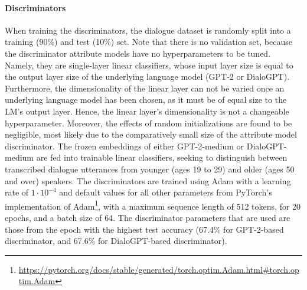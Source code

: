 \paragraph{Discriminators} When training the discriminators, the dialogue dataset is randomly split into a training (90\%) and test (10\%) set. 
Note that there is no validation set, because the discriminator attribute models have no hyperparameters to be tuned. Namely, they are single-layer linear classifiers, whose input layer size is equal to the output layer size of the underlying language model (GPT-2 or DialoGPT). Furthermore, the dimensionality of the linear layer can not be varied once an underlying language model has been chosen, as it must be of equal size to the LM's output layer. Hence, the linear layer's dimensionality is not a changeable hyperparameter. Moreover, the effects of random initializations are found to be negligible, most likely due to the comparatively small size of the attribute model discriminator.
The frozen embeddings of either GPT-2-medium \citep{radford2019language} or DialoGPT-medium \citep{zhang2019dialogpt} are fed into trainable linear classifiers, seeking to distinguish between transcribed dialogue utterances from younger (ages 19 to 29) and older (ages 50 and over) speakers. The discriminators are trained using Adam \citep{DBLP:journals/corr/KingmaB14} with a learning rate of $1\cdot10^{-4}$ 
and default values for all other parameters from PyTorch's implementation of Adam\footnote{\url{https://pytorch.org/docs/stable/generated/torch.optim.Adam.html\#torch.optim.Adam}}, 
with a maximum sequence length of 512 tokens, for 20 epochs, and a batch size of 64. The discriminator parameters that are used are those from the epoch with the highest test accuracy (67.4\% for GPT-2-based discriminator, and 67.6\% for DialoGPT-based discriminator). 




